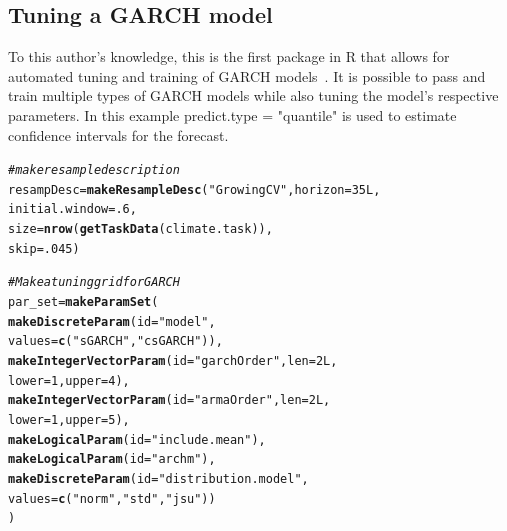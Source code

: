 \documentclass[12pt]{article}\usepackage[]{graphicx}\usepackage[]{color}
\makeatletter
\newcommand{\hlnum}[1]{\textcolor[rgb]{0.686,0.059,0.569}{#1}}%
\newcommand{\hlstr}[1]{\textcolor[rgb]{0.192,0.494,0.8}{#1}}%
\newcommand{\hlcom}[1]{\textcolor[rgb]{0.678,0.584,0.686}{\textit{#1}}}%
\newcommand{\hlstd}[1]{\textcolor[rgb]{0.345,0.345,0.345}{#1}}%
\newcommand{\hlkwb}[1]{\textcolor[rgb]{0.69,0.353,0.396}{#1}}%
\newcommand{\hlkwc}[1]{\textcolor[rgb]{0.333,0.667,0.333}{#1}}%
\newcommand{\hlkwd}[1]{\textcolor[rgb]{0.737,0.353,0.396}{\textbf{#1}}}%
\newenvironment{kframe}{%
 \def\at@end@of@kframe{}%
 \ifinner\ifhmode%
  \def\at@end@of@kframe{\end{minipage}}%
  \begin{minipage}{\columnwidth}%
 \fi\fi%
 \def\FrameCommand##1{\hskip\@totalleftmargin \hskip-\fboxsep
 \colorbox{shadecolor}{##1}\hskip-\fboxsep
     \hskip-\linewidth \hskip-\@totalleftmargin \hskip\columnwidth}%
 \MakeFramed {\advance\hsize-\width
   \@totalleftmargin\z@ \linewidth\hsize
   \@setminipage}}%
 {\par\unskip\endMakeFramed%
 \at@end@of@kframe}
\newenvironment{knitrout}{}{} %
\theoremstyle{definition}
\newcommand\code{\@codex}
\def\@codex#1{{\normalfont\ttfamily\hyphenchar\font=-1 #1}}
\let\proglang=\textsf
\makeatother
\begin{document}
\subsection{Tuning a GARCH model}

To this author's knowledge, this is the first package in \proglang{R} that allows for automated tuning and training of GARCH models~\cite{garchengels}. It is possible to pass and train multiple types of GARCH models while also tuning the model's respective parameters. In this example \code{predict.type = "quantile"} is used to estimate confidence intervals for the forecast.

\singlespacing
\begin{knitrout}
\color{fgcolor}\begin{kframe}
\begin{alltt}
\hlcom{# make resample description}
\hlstd{resampDesc} \hlkwb{=} \hlkwd{makeResampleDesc}\hlstd{(}\hlstr{"GrowingCV"}\hlstd{,} \hlkwc{horizon} \hlstd{=} \hlnum{35L}\hlstd{,}
                          \hlkwc{initial.window} \hlstd{=} \hlnum{.6}\hlstd{,}
                          \hlkwc{size} \hlstd{=} \hlkwd{nrow}\hlstd{(}\hlkwd{getTaskData}\hlstd{(climate.task)),}
                          \hlkwc{skip} \hlstd{=} \hlnum{.045}\hlstd{)}

\hlcom{# Make a tuning grid for GARCH}
\hlstd{par_set} \hlkwb{=} \hlkwd{makeParamSet}\hlstd{(}
  \hlkwd{makeDiscreteParam}\hlstd{(}\hlkwc{id} \hlstd{=} \hlstr{"model"}\hlstd{,}
                    \hlkwc{values} \hlstd{=} \hlkwd{c}\hlstd{(}\hlstr{"sGARCH"}\hlstd{,} \hlstr{"csGARCH"}\hlstd{)),}
  \hlkwd{makeIntegerVectorParam}\hlstd{(}\hlkwc{id} \hlstd{=} \hlstr{"garchOrder"}\hlstd{,} \hlkwc{len} \hlstd{=} \hlnum{2L}\hlstd{,}
                         \hlkwc{lower} \hlstd{=} \hlnum{1}\hlstd{,} \hlkwc{upper} \hlstd{=} \hlnum{4}\hlstd{),}
  \hlkwd{makeIntegerVectorParam}\hlstd{(}\hlkwc{id} \hlstd{=} \hlstr{"armaOrder"}\hlstd{,} \hlkwc{len} \hlstd{=} \hlnum{2L}\hlstd{,}
                         \hlkwc{lower} \hlstd{=} \hlnum{1}\hlstd{,} \hlkwc{upper} \hlstd{=} \hlnum{5}\hlstd{),}
  \hlkwd{makeLogicalParam}\hlstd{(}\hlkwc{id} \hlstd{=} \hlstr{"include.mean"}\hlstd{),}
  \hlkwd{makeLogicalParam}\hlstd{(}\hlkwc{id} \hlstd{=} \hlstr{"archm"}\hlstd{),}
  \hlkwd{makeDiscreteParam}\hlstd{(}\hlkwc{id} \hlstd{=} \hlstr{"distribution.model"}\hlstd{,}
                    \hlkwc{values} \hlstd{=} \hlkwd{c}\hlstd{(}\hlstr{"norm"}\hlstd{,}\hlstr{"std"}\hlstd{,}\hlstr{"jsu"}\hlstd{))}
\hlstd{)}


\end{alltt}
\end{kframe}
\end{knitrout}
\end{document}
